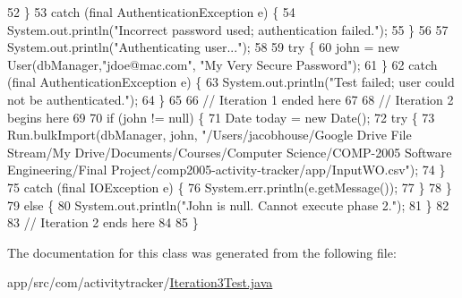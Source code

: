 \begin{DoxyCode}
52         \}
53         \textcolor{keywordflow}{catch} (\textcolor{keyword}{final} AuthenticationException e) \{
54             System.out.println(\textcolor{stringliteral}{"Incorrect password used; authentication failed."});
55         \}
56 
57         System.out.println(\textcolor{stringliteral}{"Authenticating user..."});
58 
59         \textcolor{keywordflow}{try} \{
60             john = \textcolor{keyword}{new} User(dbManager,\textcolor{stringliteral}{"jdoe@mac.com"}, \textcolor{stringliteral}{"My Very Secure Password"});
61         \}
62         \textcolor{keywordflow}{catch} (\textcolor{keyword}{final} AuthenticationException e) \{
63             System.out.println(\textcolor{stringliteral}{"Test failed; user could not be authenticated."});
64         \}
65 
66         \textcolor{comment}{// Iteration 1 ended here}
67 
68         \textcolor{comment}{// Iteration 2 begins here}
69 
70         \textcolor{keywordflow}{if} (john !=  null) \{
71             Date today = \textcolor{keyword}{new} Date();
72             \textcolor{keywordflow}{try} \{
73                 Run.bulkImport(dbManager, john, \textcolor{stringliteral}{"/Users/jacobhouse/Google Drive File Stream/My
       Drive/Documents/Courses/Computer Science/COMP-2005 Software Engineering/Final
       Project/comp2005-activity-tracker/app/InputWO.csv"});
74             \}
75             \textcolor{keywordflow}{catch} (\textcolor{keyword}{final} IOException e) \{
76                 System.err.println(e.getMessage());
77             \}
78         \}
79         \textcolor{keywordflow}{else} \{
80             System.out.println(\textcolor{stringliteral}{"John is null. Cannot execute phase 2."});
81         \}
82 
83         \textcolor{comment}{// Iteration 2 ends here}
84 
85     \}
\end{DoxyCode}


The documentation for this class was generated from the following file\+:\begin{DoxyCompactItemize}
\item 
app/src/com/activitytracker/\mbox{\hyperlink{_iteration3_test_8java}{Iteration3\+Test.\+java}}\end{DoxyCompactItemize}
